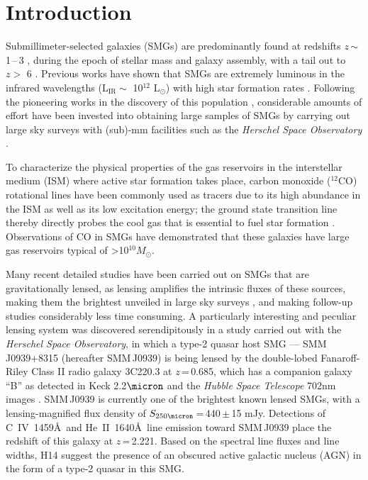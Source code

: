 \documentclass[iop, revtex4]{emulateapj}
\newcommand{\Msun}{\mbox{$M_{\odot}$}}
\newcommand{\Lsun}{\mbox{L$_{\odot}$}}
\newcommand{\eg}{{\sl e.g.,~}}
\newcommand{\pmOne}{\mbox{$^{-1}$}}
\begin{document}
\section{Introduction}\label{sec:intro}
Submillimeter-selected galaxies (SMGs) are predominantly found at redshifts $z$\,$\sim$\,1\,--\,3 \citep{Chapman05a}, during the epoch of stellar mass and
galaxy assembly, with a tail out to $z>$ 6 \citep{Riechers13a}.
Previous works
have shown that SMGs
 are extremely luminous in the infrared
 wavelengths (L$_\textrm{IR} \sim$ 10$^{12}$ \Lsun) with high star formation rates \citep[SFR $\gtrsim$\,500\,\Msun yr\pmOne; see \eg reviews by][]{Blain02a, Lagache05a,Casey14a}.
Following the pioneering works in the discovery of this population \citep{Smail97a,Hughes98a,Barger98a}, considerable amounts of effort have been invested into
obtaining large samples of SMGs by carrying out
  large sky surveys with (sub)-mm facilities such as the {\it Herschel Space Observatory} \citep[\eg H-ATLAS, SPT, HerMES; ][]{Eales10a,Carlstrom11a,Oliver12a}.
 
  To characterize the physical properties of the gas reservoirs in the interstellar medium (ISM) where active star formation takes place, carbon monoxide ($^{12}$CO) rotational lines have been commonly used as tracers due to its high abundance in the ISM as well as its low excitation energy; the ground state transition line thereby directly probes the cool gas that is essential to fuel star formation \citep[see \eg reviews by][]{Solomon05a,Carilli13a}. Observations of CO in SMGs
  have demonstrated that these galaxies have large gas reservoirs typical of \textgreater 10$^{10}$\Msun \citep[\eg][]{Frayer98a, Neri03a, Riechers11c, Riechers11d, Ivison11a, Bothwell13a}.

Many recent detailed studies have been carried out on SMGs that are gravitationally lensed,
 as lensing amplifies the intrinsic fluxes of these sources, making them the brightest unveiled in large sky surveys \citep{Negrello10a,Vieira10a,Oliver12a}, and making follow-up studies considerably less time consuming.
A particularly interesting and peculiar lensing system was discovered serendipitously in a study carried out with the {\it Herschel Space Observatory}, in which
a type-2 quasar host SMG --- SMM\,J0939+8315 (hereafter SMM\,J0939) is being lensed by the double-lobed Fanaroff-Riley
Class II \citep*[FR-II; ][]{Fanaroff74} radio galaxy 3C220.3 at $z$\,=\,0.685, which has a
companion galaxy ``B'' as detected in Keck 2.2$\micron$ and the {\it Hubble Space Telescope} 702nm images \citep[hereafter H14]{Haas14}.
SMM\,J0939 is currently one of the brightest known lensed
SMGs, with a lensing-magnified flux density of $S_\textrm{250\micron}$\,=\,440\,$\pm$\,15 mJy.
Detections of C~{\scriptsize\sc IV}~1459\AA\
 and He~{\scriptsize\sc II}~1640\AA\ line emission toward SMM\,J0939
 place the redshift of this galaxy at $z$\,=\,2.221. Based on the spectral line fluxes and line widths, H14 suggest the presence of an obscured active galactic nucleus (AGN) in the form of a type-2 quasar in this SMG.
\end{document}
